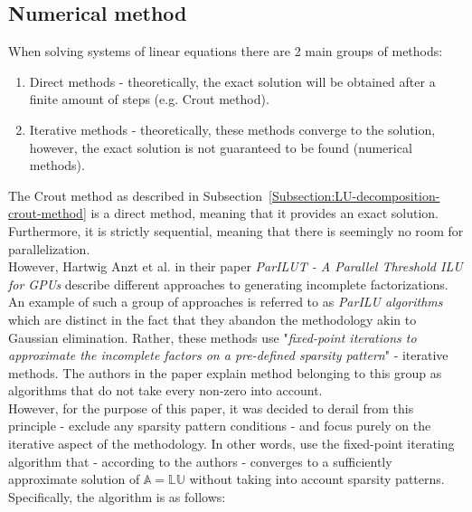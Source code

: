 \subsection{Numerical method \TO}\label{Subsection:LU-decomposition-numerical-method}
When solving systems of linear equations there are 2 main groups of methods:

\begin{enumerate}
	\item Direct methods - theoretically, the exact solution will be obtained after a finite amount of steps (e.g. Crout method).
	\item Iterative methods - theoretically, these methods converge to the solution, however, the exact solution is not guaranteed to be found (numerical methods).
\end{enumerate}

The Crout method as described in Subsection~\ref{Subsection:LU-decomposition-crout-method} is a direct method, meaning that it provides an exact solution. Furthermore, it is strictly sequential, meaning that there is seemingly no room for parallelization. \\
However, Hartwig Anzt et al. in their paper \emph{ParILUT - A Parallel Threshold ILU for GPUs} \cite{Anzt2019} describe different approaches to generating incomplete factorizations. An example of such a group of approaches is referred to as \textit{ParILU algorithms} which are distinct in the fact that they abandon the methodology akin to Gaussian elimination. Rather, these methods use "\textit{fixed-point iterations to approximate the incomplete factors on a pre-defined sparsity pattern}" - iterative methods. The authors in the paper explain method belonging to this group as algorithms that do not take every non-zero into account. \\
However, for the purpose of this paper, it was decided to derail from this principle - exclude any sparsity pattern conditions - and focus purely on the iterative aspect of the methodology. In other words, use the fixed-point iterating algorithm that - according to the authors - converges to a sufficiently approximate solution of $ \mathbb{A} = \mathbb{LU} $ without taking into account sparsity patterns. \\
Specifically, the algorithm is as follows:


